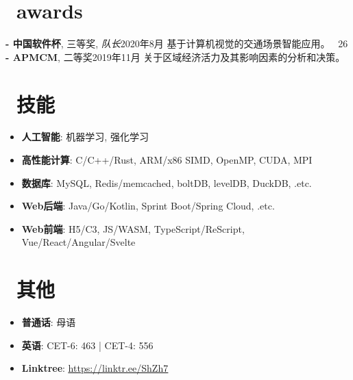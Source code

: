 \documentclass{common}
\begin{document}
\section{\faTrophy\ awards}
\award
    {\textbf{- 中国软件杯}, 三等奖, \textit{队长}}{2020年8月}
    {基于计算机视觉的交通场景智能应用。 
        {\href{https://github.com/Sh-Zh-7/intelligent-transportation-system}{\underline{\faGithub}} \faStarO\ 26}
    }
\award
    {\textbf{- APMCM}, 二等奖}{2019年11月}
    {关于区域经济活力及其影响因素的分析和决策。}

\section{\faCogs\ 技能}
\begin{itemize}[parsep=0.5ex]
    \item \textbf{人工智能}: 机器学习, 强化学习
    \item \textbf{高性能计算}: C/C++/Rust, ARM/x86 SIMD, OpenMP, CUDA, MPI
    \item \textbf{数据库}: MySQL, Redis/memcached, boltDB, levelDB, DuckDB, .etc.
    \item \textbf{Web后端}: Java/Go/Kotlin, Sprint Boot/Spring Cloud, .etc.
    \item \textbf{Web前端}: H5/C3, JS/WASM, TypeScript/ReScript, Vue/React/Angular/Svelte
\end{itemize}

\section{\faInfo\ 其他}
\begin{itemize}[parsep=0.5ex]
    \item \textbf{普通话}: 母语
    \item \textbf{英语}: CET-6: 463 | CET-4: 556
    \item \textbf{Linktree}: \href{https://linktr.ee/ShZh7}{\underline{https://linktr.ee/ShZh7}}
\end{itemize}
\end{document}
